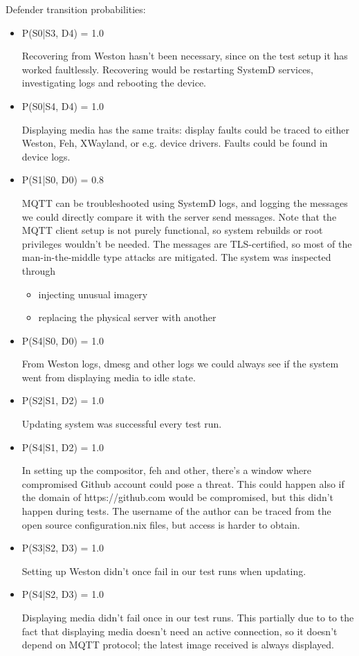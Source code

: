 Defender transition probabilities:

\begin{itemize}
\item P(S0|S3, D4) = 1.0

Recovering from Weston hasn't been necessary, since on the test setup it has worked faultlessly. Recovering would be restarting SystemD services, investigating logs and rebooting the device.
\item P(S0|S4, D4) = 1.0

Displaying media has the same traits: display faults could be traced to either Weston, Feh, XWayland, or e.g. device drivers. Faults could be found in device logs.
\item P(S1|S0, D0) = 0.8

MQTT can be troubleshooted using SystemD logs, and logging the messages we could directly compare it with the server send messages. Note that the MQTT client setup is not purely functional, so system rebuilds or root privileges wouldn't be needed. The messages are TLS-certified, so most of the man-in-the-middle type attacks are mitigated. The system was inspected through 
\begin{itemize}

\item injecting unusual imagery
\item replacing the physical server with another
\end{itemize}

\item P(S4|S0, D0) = 1.0

From Weston logs, dmesg and other logs we could always see if the system went from displaying media to idle state.

\item P(S2|S1, D2) = 1.0

Updating system was successful every test run.

\item P(S4|S1, D2) = 1.0

In setting up the compositor, feh and other, there's a window where compromised Github account could pose a threat. This could happen also if the domain of https://github.com would be compromised, but this didn't happen during tests. The username of the author can be traced from the open source configuration.nix files, but access is harder to obtain.

\item P(S3|S2, D3) = 1.0

Setting up Weston didn't once fail in our test runs when updating.

\item P(S4|S2, D3) = 1.0

Displaying media didn't fail once in our test runs. This partially due to to the fact that displaying media doesn't need an active connection, so it doesn't depend on MQTT protocol; the latest image received is always displayed.

\end{itemize}

